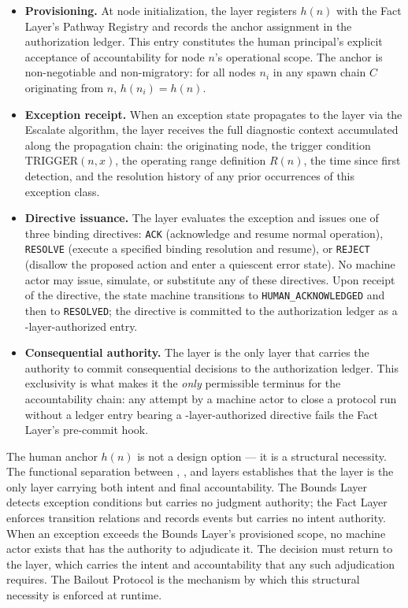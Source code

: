 \begin{itemize}\itemsep=0pt
\item[(\textit{i})] \textbf{Provisioning.} At node initialization, the \purpose{} layer registers $h(n)$ with the Fact Layer's Pathway Registry and records the anchor assignment in the authorization ledger. This entry constitutes the human principal's explicit acceptance of accountability for node $n$'s operational scope. The anchor is non-negotiable and non-migratory: for all nodes $n_i$ in any spawn chain $C$ originating from $n$, $h(n_i) = h(n)$.

\item[(\textit{ii})] \textbf{Exception receipt.} When an exception state propagates to the \purpose{} layer via the Escalate algorithm, the \purpose{} layer receives the full diagnostic context accumulated along the propagation chain: the originating node, the trigger condition $\text{TRIGGER}(n, x)$, the operating range definition $R(n)$, the time since first detection, and the resolution history of any prior occurrences of this exception class.

\item[(\textit{iii})] \textbf{Directive issuance.} The \purpose{} layer evaluates the exception and issues one of three binding directives: \texttt{ACK} (acknowledge and resume normal operation), \texttt{RESOLVE} (execute a specified binding resolution and resume), or \texttt{REJECT} (disallow the proposed action and enter a quiescent error state). No machine actor may issue, simulate, or substitute any of these directives. Upon receipt of the directive, the state machine transitions to \texttt{HUMAN\_ACKNOWLEDGED} and then to \texttt{RESOLVED}; the directive is committed to the authorization ledger as a \purpose-layer-authorized entry.

\item[(\textit{iv})] \textbf{Consequential authority.} The \purpose{} layer is the only layer that carries the authority to commit consequential decisions to the authorization ledger. This exclusivity is what makes it the \emph{only} permissible terminus for the accountability chain: any attempt by a machine actor to close a protocol run without a ledger entry bearing a \purpose-layer-authorized directive fails the Fact Layer's pre-commit hook.
\end{itemize}

The human anchor $h(n)$ is not a design option — it is a structural necessity. The functional separation between \purpose{}, \bounds{}, and \fact{} layers establishes that the \purpose{} layer is the only layer carrying both intent and final accountability. The Bounds Layer detects exception conditions but carries no judgment authority; the Fact Layer enforces transition relations and records events but carries no intent authority. When an exception exceeds the Bounds Layer's provisioned scope, no machine actor exists that has the authority to adjudicate it. The decision must return to the \purpose{} layer, which carries the intent and accountability that any such adjudication requires. The Bailout Protocol is the mechanism by which this structural necessity is enforced at runtime.

